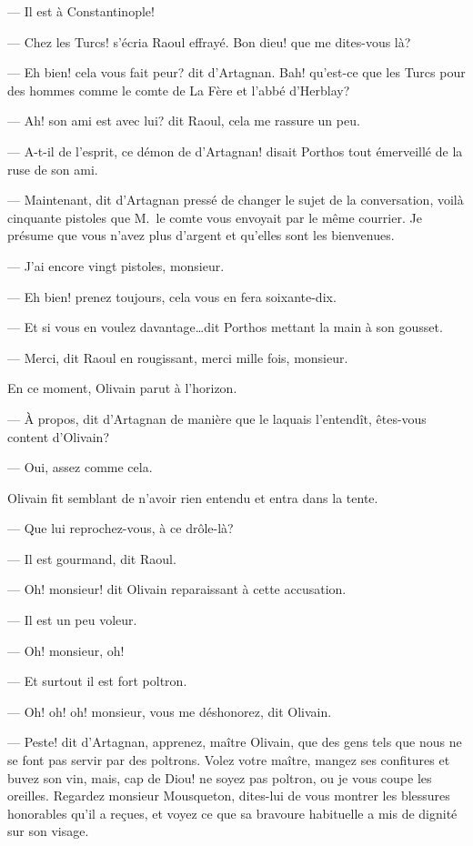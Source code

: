 — Il est à Constantinople!

— Chez les Turcs! s'écria Raoul effrayé. Bon dieu! que me dites-vous là?

— Eh bien! cela vous fait peur? dit d'Artagnan. Bah! qu'est-ce que les Turcs pour des hommes comme le comte de La Fère et l'abbé d'Herblay?

— Ah! son ami est avec lui? dit Raoul, cela me rassure un peu.

— A-t-il de l'esprit, ce démon de d'Artagnan! disait Porthos tout émerveillé de la ruse de son ami.

— Maintenant, dit d'Artagnan pressé de changer le sujet de la conversation, voilà cinquante pistoles que M.~le comte vous envoyait par le même courrier. Je présume que vous n'avez plus d'argent et qu'elles sont les bienvenues.

— J'ai encore vingt pistoles, monsieur.

— Eh bien! prenez toujours, cela vous en fera soixante-dix.

— Et si vous en voulez davantage\dots dit Porthos mettant la main à son gousset.

— Merci, dit Raoul en rougissant, merci mille fois, monsieur.

En ce moment, Olivain parut à l'horizon.

— À propos, dit d'Artagnan de manière que le laquais l'entendît, êtes-vous content d'Olivain?

— Oui, assez comme cela.

Olivain fit semblant de n'avoir rien entendu et entra dans la tente.

— Que lui reprochez-vous, à ce drôle-là?

— Il est gourmand, dit Raoul.

— Oh! monsieur! dit Olivain reparaissant à cette accusation.

— Il est un peu voleur.

— Oh! monsieur, oh!

— Et surtout il est fort poltron.

— Oh! oh! oh! monsieur, vous me déshonorez, dit Olivain.

— Peste! dit d'Artagnan, apprenez, maître Olivain, que des gens tels que nous ne se font pas servir par des poltrons. Volez votre maître, mangez ses confitures et buvez son vin, mais, cap de Diou! ne soyez pas poltron, ou je vous coupe les oreilles. Regardez monsieur Mousqueton, dites-lui de vous montrer les blessures honorables qu'il a reçues, et voyez ce que sa bravoure habituelle a mis de dignité sur son visage.

